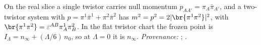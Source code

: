On the real slice a single twistor carries null momentum $p_{AA'} = \pi_{A}\bar\pi_{A'}$, and a two-twistor system with $p = \pi^{1}\bar\pi^{1} + \pi^{2}\bar\pi^{2}$ has $m^{2} = p^{2} = 2|\br{\pi^{1}\pi^{2}}|^{2}$, with $\br{\pi^{1}\pi^{2}} = \varepsilon^{AB}\pi^{1}_{A}\pi^{2}_{B}$. In the flat twistor chart the frozen point is $I_{\Lambda} = n_{\infty} + (\Lambda/6)\,n_{0}$, so at $\Lambda = 0$ it is $n_{\infty}$. \emph{Provenance:} \cite[Prop.~4.1, Lem.~5.1]{ButlerT11}; \cite[Fact~2.5]{ButlerT12}.
